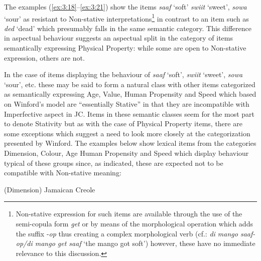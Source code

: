  \z \z

The examples (\ref{ex:3:18}--\ref{ex:3:21}) show the items
\textit{saaf} `soft' \textit{swiit} `sweet', \textit{sowa} `sour’ as
resistant to Non-stative interpretations\footnote{Non-stative
  expression for such items are available through the use of the
  semi-copula form \textit{get} or by means of the morphological
  operation which adds the suffix -\textit{op} thus creating a complex
  morphological verb (cf.: \textit{di mango saaf-op\slash di mango get
    saaf} `the mango got soft') however, these have no immediate
  relevance to this discussion.} in contrast to an item such as
\textit{ded}  `dead' which presumably falls in the same semantic
category.  This difference in aspectual behaviour suggests an
aspectual split in the category of items semantically expressing
Physical Property: while some are open to Non-stative expression,
others are not.

In the case of items displaying the behaviour of \textit{saaf} `soft',
\textit{swiit} `sweet', \textit{sowa} `sour',  etc. these may be said to
form a natural class with other items categorized as semantically
expressing Age, Value, Human Propensity and Speed which based on
Winford’s model are “essentially Stative” in that they are
incompatible with Imperfective aspect in JC.  Items in these semantic
classes seem for the most part to denote Stativity but as with the
case of Physical Property items, there are some exceptions which
suggest a need to look more closely at the categorization presented by
Winford. The examples below show lexical items from the categories
Dimension, Colour, Age Human Propensity and Speed which display
behaviour typical of these groups since, as indicated, these are
expected not to be compatible with Non-stative meaning:

\ea%
\label{ex:3:22}
(Dimension) Jamaican Creole \\



